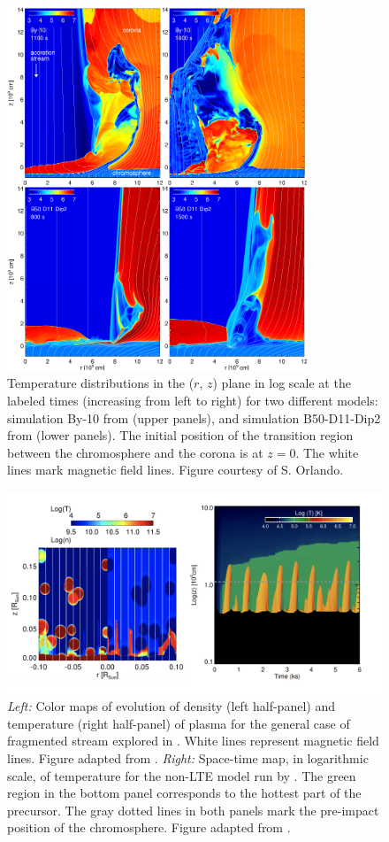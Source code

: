 \documentclass[graybox, nosecnum]{svmult}
\begin{document}
\begin{figure}[t]
    \centering
    \includegraphics[width=9cm]{figs/accretion.pdf}
    \caption{Temperature distributions in the ($r$, $z$) plane in log scale at the labeled times (increasing from left to right) for two different models: simulation By-10 from \cite{Orlando_2010} (upper panels), and simulation B50-D11-Dip2 from \cite{Orlando_2013} (lower panels). The initial position of the transition region between the chromosphere and the corona is at $z = 0$. The white lines mark magnetic field lines. Figure courtesy of S. Orlando.}
    \label{fig:accretion}
\end{figure}

\begin{figure}[t]
    \centering
    \includegraphics[width=12cm]{figs/colombo.png}
    \caption{\emph{Left:} Color maps of evolution of density (left half-panel) and temperature (right half-panel) of plasma for the general case of fragmented stream explored in \cite{Colombo_2016}. White lines represent magnetic field lines. Figure adapted from \cite{Colombo_2016}. 
    \emph{Right:} Space-time map, in logarithmic scale, of temperature for the non-LTE model run by \cite{Colombo_2019b}. The green region in the
    bottom panel corresponds to the hottest part of the precursor. The gray
    dotted lines in both panels mark the pre-impact position of the 
    chromosphere. Figure adapted from \cite{Colombo_2019b}.}
    \label{fig:colombo}
\end{figure}
\end{document}

